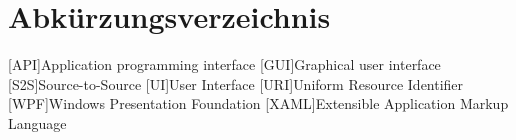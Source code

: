 \chapter{Abkürzungsverzeichnis}
\begin{acronym}[XAML]
[API]{Application programming interface}
[GUI]{Graphical user interface}
[S2S]{Source-to-Source}
[UI]{User Interface}
[URI]{Uniform Resource Identifier}
[WPF]{Windows Presentation Foundation}
[XAML]{Extensible Application Markup Language}
\end{acronym}